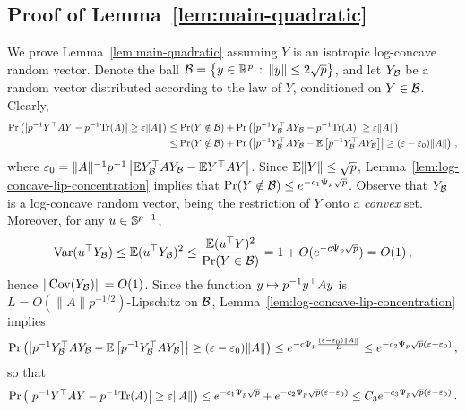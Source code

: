 \documentclass[times,sort&compress,3p]{elsarticle}
\begin{document}
\subsection{Proof of Lemma~\ref{lem:main-quadratic}}
\label{sec:proof:lem:main-quadratic}

We prove Lemma~\ref{lem:main-quadratic} assuming $Y$ is an isotropic log-concave random vector.
Denote the ball $\mathcal{B} = \left\{ y\in \mathbb{R}^p\,:\,\|y\|\le 2\sqrt{p} \right\}$,
and let $Y_{\mathcal{B}}$ be a random vector distributed according to the law of $Y$, conditioned on $Y\in \mathcal{B}$. Clearly,
\begin{align*}
    \Pr\left( \left| p^{-1}Y^\top A Y - p^{-1}\textrm{Tr}(A) \right| \ge \varepsilon\|A\| \right) 
    &\le \Pr(Y\notin \mathcal{B}) + \Pr\left( \left| p^{-1}Y_{\mathcal{B}}^\top A Y_{\mathcal{B}} - p^{-1}\textrm{Tr}(A) \right| \ge \varepsilon\|A\| \right) \\
    &\le \Pr(Y\notin \mathcal{B}) + \Pr\left( \left| p^{-1}Y_{\mathcal{B}}^\top A Y_{\mathcal{B}} - {\mathbb{E}}\left[ p^{-1}Y_{\mathcal{B}}^\top A Y_{\mathcal{B}} \right] \right| \ge (\varepsilon-\varepsilon_0)\|A\| \right) \,,
\end{align*}
where $\varepsilon_0 = \|A\|^{-1} p^{-1}\left| {\mathbb{E}} Y_{\mathcal{B}}^\top A Y_{\mathcal{B}} - {\mathbb{E}} Y^\top A Y \right|$.
Since ${\mathbb{E}}\|Y\|\le \sqrt{p}$, 
Lemma~\ref{lem:log-concave-lip-concentration} implies that $\Pr(Y\notin \mathcal{B})\le e^{-c_1\Psi_p\sqrt{p}}$. Observe that $Y_{\mathcal{B}}$ is a log-concave random vector, being the restriction of $Y$ onto a \emph{convex} set. Moreover, for any $u\in \mathbb{S}^{p-1}$,
\[
\mathrm{Var}(u^\top Y_{\mathcal{B}}) \le {\mathbb{E}}(u^\top Y_{\mathcal{B}})^2 \le \frac{{\mathbb{E}}(u^\top Y)^2}{\Pr(Y\in \mathcal{B})} = 1 + O(e^{-c\Psi_p\sqrt{p}})=O(1) \,, 
\]
hence $\|\mathrm{Cov}(Y_{\mathcal{B}})\| = O(1) $. Since the function $y\mapsto p^{-1}y^\top A y$ is $L=O(\|A\|p^{-1/2})$-Lipschitz on $\mathcal{B}$, Lemma~\ref{lem:log-concave-lip-concentration} implies
\begin{align*}
    \Pr\left( \left| p^{-1}Y_{\mathcal{B}}^\top A Y_{\mathcal{B}} - {\mathbb{E}}\left[ p^{-1}Y_{\mathcal{B}}^\top A Y_{\mathcal{B}} \right] \right| \ge (\varepsilon-\varepsilon_0)\|A\| \right) 
    \le e^{-c \Psi_p \frac{(\varepsilon-\varepsilon_0)\|A\|}{L}} \le e^{-c_2\Psi_p \sqrt{p}(\varepsilon-\varepsilon_0)} \,,
\end{align*}
so that 
\[
\Pr\left( \left| p^{-1}Y^\top A Y - p^{-1}\textrm{Tr}(A) \right| \ge \varepsilon\|A\| \right)  \le e^{-c_1\Psi_p \sqrt{p}} + e^{-c_2\Psi_p \sqrt{p}(\varepsilon-\varepsilon_0)} \le C_3e^{-c_3\Psi_p \sqrt{p}(\varepsilon-\varepsilon_0)} \,.
\]
\end{document}
